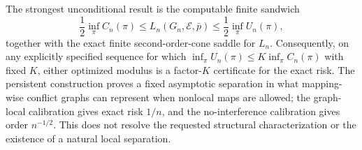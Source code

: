 The strongest unconditional result is the computable finite sandwich
\[
 \frac12\inf_\pi C_n(\pi)\le L_n(G_n,\mathcal E,\bar p)
 \le\frac12\inf_\pi U_n(\pi),
\]
together with the exact finite second-order-cone saddle for \(L_n\).  Consequently, on any explicitly specified sequence for which \(\inf_\pi U_n(\pi)\le K\inf_\pi C_n(\pi)\) with fixed \(K\), either optimized modulus is a factor-\(K\) certificate for the exact risk.  The persistent construction proves a fixed asymptotic separation in what mapping-wise conflict graphs can represent when nonlocal maps are allowed; the graph-local calibration gives exact risk \(1/n\), and the no-interference calibration gives order \(n^{-1/2}\).  This does not resolve the requested structural characterization or the existence of a natural local separation.